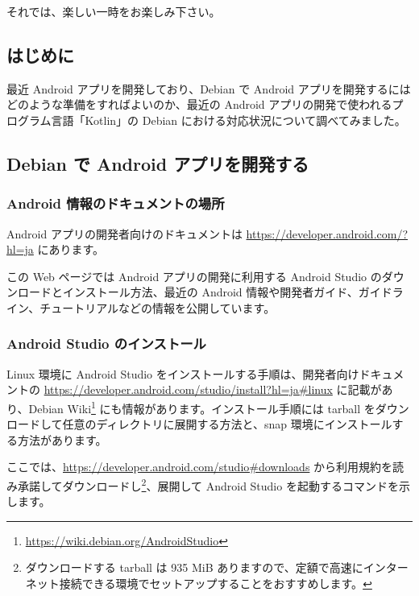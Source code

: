 \documentclass[mingoth,a4paper]{jsarticle}
\begin{document}
 それでは、楽しい一時をお楽しみ下さい。
 

\subsection{はじめに}

最近 Android アプリを開発しており、Debian で Android アプリを開発するには
どのような準備をすればよいのか、最近の Android アプリの開発で使われるプログラム言語「Kotlin」の Debian における対応状況について調べてみました。


\subsection{Debian で Android アプリを開発する}

\subsubsection{Android 情報のドキュメントの場所}

Android アプリの開発者向けのドキュメントは \url{https://developer.android.com/?hl=ja} にあります。

この Web ページでは Android アプリの開発に利用する Android Studio のダウンロードとインストール方法、最近の Android 情報や開発者ガイド、ガイドライン、チュートリアルなどの情報を公開しています。


\subsubsection{Android Studio のインストール}

Linux 環境に Android Studio をインストールする手順は、開発者向けドキュメントの \url{https://developer.android.com/studio/install?hl=ja#linux} に記載があり、Debian Wiki\footnote{\url{https://wiki.debian.org/AndroidStudio}} にも情報があります。インストール手順には tarball をダウンロードして任意のディレクトリに展開する方法と、snap 環境にインストールする方法があります。

ここでは、\url{https://developer.android.com/studio#downloads} から利用規約を読み承諾してダウンロードし\footnote{ダウンロードする tarball は 935 MiB ありますので、定額で高速にインターネット接続できる環境でセットアップすることをおすすめします。}、展開して Android Studio を起動するコマンドを示します。
\end{document}
